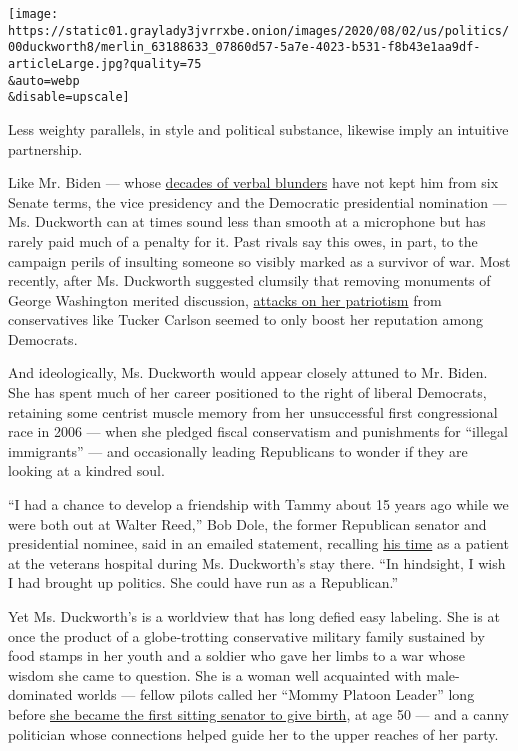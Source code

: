 \texttt{[image: https://static01.graylady3jvrrxbe.onion/images/2020/08/02/us/politics/00duckworth8/merlin\_63188633\_07860d57-5a7e-4023-b531-f8b43e1aa9df-articleLarge.jpg?quality=75\\\&auto=webp\\\&disable=upscale]}

Less weighty parallels, in style and political substance, likewise imply
an intuitive partnership.

Like Mr. Biden --- whose
\href{https://www.nytimes3xbfgragh.onion/2019/10/30/us/politics/joe-biden-debate-gaffes.html}{decades
of verbal blunders} have not kept him from six Senate terms, the vice
presidency and the Democratic presidential nomination --- Ms. Duckworth
can at times sound less than smooth at a microphone but has rarely paid
much of a penalty for it. Past rivals say this owes, in part, to the
campaign perils of insulting someone so visibly marked as a survivor of
war. Most recently, after Ms. Duckworth suggested clumsily that removing
monuments of George Washington merited discussion,
\href{https://www.nytimes3xbfgragh.onion/2020/07/08/us/politics/tucker-carlson-tammy-duckworth.html}{attacks
on her patriotism} from conservatives like Tucker Carlson seemed to only
boost her reputation among Democrats.

And ideologically, Ms. Duckworth would appear closely attuned to Mr.
Biden. She has spent much of her career positioned to the right of
liberal Democrats, retaining some centrist muscle memory from her
unsuccessful first congressional race in 2006 --- when she pledged
fiscal conservatism and punishments for ``illegal immigrants'' --- and
occasionally leading Republicans to wonder if they are looking at a
kindred soul.

``I had a chance to develop a friendship with Tammy about 15 years ago
while we were both out at Walter Reed,'' Bob Dole, the former Republican
senator and presidential nominee, said in an emailed statement,
recalling
\href{https://www.nytimes3xbfgragh.onion/2005/04/10/politics/dole-discloses-emergency-that-nearly-took-his-life.html}{his
time} as a patient at the veterans hospital during Ms. Duckworth's stay
there. ``In hindsight, I wish I had brought up politics. She could have
run as a Republican.''

Yet Ms. Duckworth's is a worldview that has long defied easy labeling.
She is at once the product of a globe-trotting conservative military
family sustained by food stamps in her youth and a soldier who gave her
limbs to a war whose wisdom she came to question. She is a woman well
acquainted with male-dominated worlds --- fellow pilots called her
``Mommy Platoon Leader'' long before
\href{https://www.nytimes3xbfgragh.onion/2018/04/09/us/politics/tammy-duckworth-birth.html}{she
became the first sitting senator to give birth}, at age 50 --- and a
canny politician whose connections helped guide her to the upper reaches
of her party.

